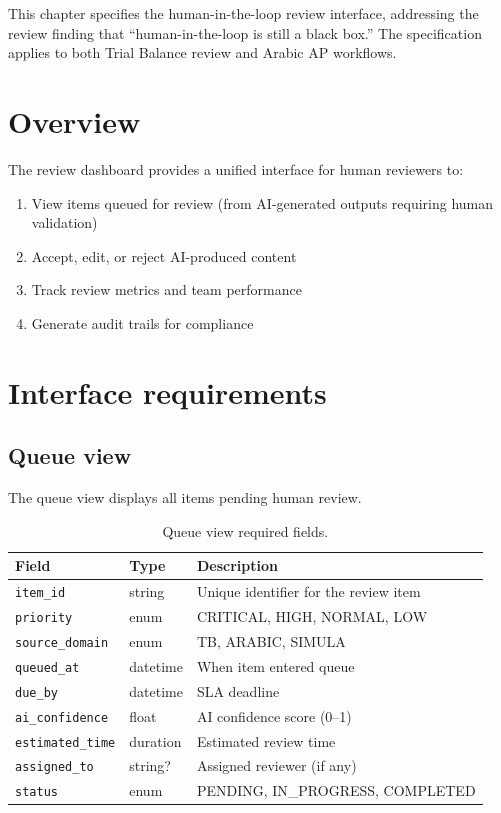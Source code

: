 \documentclass[11pt,a4paper,twoside]{report}
\begin{document}
This chapter specifies the human-in-the-loop review interface, addressing the
review finding that ``human-in-the-loop is still a black box.'' The
specification applies to both Trial Balance review and Arabic AP workflows.

\section{Overview}

The review dashboard provides a unified interface for human reviewers to:

\begin{enumerate}
\item View items queued for review (from AI-generated outputs requiring
human validation)
\item Accept, edit, or reject AI-produced content
\item Track review metrics and team performance
\item Generate audit trails for compliance
\end{enumerate}

\section{Interface requirements}

\subsection{Queue view}

The queue view displays all items pending human review.

\begin{table}[htbp]
\centering
\caption{Queue view required fields.}
\label{tab:queue-fields}
\footnotesize
\begin{tabularx}{\linewidth}{@{}l l X@{}}
\toprule
\textbf{Field} & \textbf{Type} & \textbf{Description} \\ \midrule
\texttt{item\_id} & string & Unique identifier for the review item \\
\texttt{priority} & enum & CRITICAL, HIGH, NORMAL, LOW \\
\texttt{source\_domain} & enum & TB, ARABIC, SIMULA \\
\texttt{queued\_at} & datetime & When item entered queue \\
\texttt{due\_by} & datetime & SLA deadline \\
\texttt{ai\_confidence} & float & AI confidence score (0--1) \\
\texttt{estimated\_time} & duration & Estimated review time \\
\texttt{assigned\_to} & string? & Assigned reviewer (if any) \\
\texttt{status} & enum & PENDING, IN\_PROGRESS, COMPLETED \\
\bottomrule
\end{tabularx}
\end{table}
\end{document}
